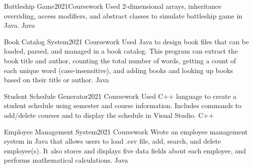 %
%
%


\begin{projects}
	\project
	{Battleship Game}{2021}{Coursework}
	{Used 2-dimensional arrays, inheritance overriding, access modifiers, and abstract classes to simulate battleship game in Java.}
	{Java}
				
	\project
	{Book Catalog System}{2021}
	{Coursework}
	{Used Java to design book files that can be loaded, parsed, and managed in a book catalog. This program can extract the book title and author, counting the total number of words, getting a count of each unique word (case-insensitive), and adding books and looking up books based on their title or author.}
	{Java}

    \project
	{Student Schedule Generator}{2021}
	{Coursework}
	{Used C++ language to create a student schedule using semester and course information. Includes commands to add/delete courses and to display the schedule in Visual Studio.}
	{C++}
	
	\project
	{Employee Management System}{2021}
	{Coursework}
	{Wrote an employee management system in Java that allows users to load .csv file, add, search, and delete employee(s). It also stores and displays five data fields about each employee, and performs mathematical calculations.}
	{Java}
\end{projects}